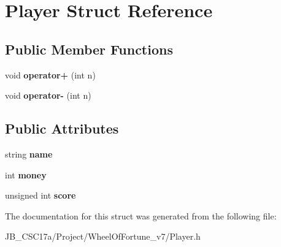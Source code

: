\hypertarget{struct_player}{}\section{Player Struct Reference}
\label{struct_player}
\subsection*{Public Member Functions}
\begin{DoxyCompactItemize}
\item 
\hypertarget{struct_player_ac13db53be14f078b1c7e9e4750f21ac6}{}\label{struct_player_ac13db53be14f078b1c7e9e4750f21ac6} 
void {\bfseries operator+} (int n)
\item 
\hypertarget{struct_player_add3e9da9c3925ecab8ccd15c1d14ef52}{}\label{struct_player_add3e9da9c3925ecab8ccd15c1d14ef52} 
void {\bfseries operator-\/} (int n)
\end{DoxyCompactItemize}
\subsection*{Public Attributes}
\begin{DoxyCompactItemize}
\item 
\hypertarget{struct_player_acf0355128a99ee20ad9931b760fb2de1}{}\label{struct_player_acf0355128a99ee20ad9931b760fb2de1} 
string {\bfseries name}
\item 
\hypertarget{struct_player_a9545beef70350d5c3b3a5719a890dd2f}{}\label{struct_player_a9545beef70350d5c3b3a5719a890dd2f} 
int {\bfseries money}
\item 
\hypertarget{struct_player_a38a6dafe988a768a435cc0a9fde38e46}{}\label{struct_player_a38a6dafe988a768a435cc0a9fde38e46} 
unsigned int {\bfseries score}
\end{DoxyCompactItemize}


The documentation for this struct was generated from the following file\+:\begin{DoxyCompactItemize}
\item 
J\+B\+\_\+\+C\+S\+C17a/\+Project/\+Wheel\+Of\+Fortune\+\_\+v7/Player.\+h\end{DoxyCompactItemize}
